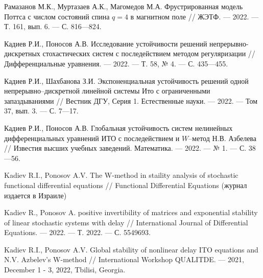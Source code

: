 \begin{thebibliography}{111}
Рамазанов М.К., Муртазаев А.К., Магомедов М.А.
Фрустрированная модель Поттса с числом состояний спина $q = 4$ в магнитном поле
//
ЖЭТФ.
--- 2022.
--- Т. 161, вып. 6.
--- С. 816---824.



Кадиев Р.И., Поносов А.В.
Исследование устойчивости решений непрерывно-дискретных стохастических систем с последействием методом регуляризации
//
Дифференциальные уравнения.
--- 2022.
--- Т. 58, № 4.
--- С. 435---455.

Кадиев Р.И., Шахбанова З.И.
Экспоненциальная устойчивость решений одной непрерывно--дискретной линейной системы Ито с ограниченными запаздываниями
//
Вестник ДГУ, Серия 1. Естественные науки.
--- 2022.
--- Том 37, вып. 3.
--- С. 7---17.

Кадиев Р.И., Поносов А.В. 
Глобальная устойчивость систем нелинейных дифференциальных уравнений ИТО с последействием и $W$--метод Н.В. Азбелева
//
Известия высших учебных заведений. Математика.
--- 2022.
--- № 1.
--- С. 38---56.

Kadiev R.I., Ponosov A.V.
The W-method in staility analysis of stochastic functional differential equations
//
Functional Differential Equations
(журнал издается в Израиле)

Kadiev R., Ponosov A. positive invertibility of matrices and
exponential stability of linear stochastic systems with delay
//
International Journal of Differential Equations.
--- 2022.
--- Т. 2022.
--- С. 5549693.

Kadiev R.I., Ponosov A.V.
Global stability of nonlinear delay ITO equations and N.V. Azbelev's W-method 
//
International Workshop QUALITDE.
--- 2021, December 1 - 3, 2022, Tbilisi, Georgia.

\end{thebibliography} 